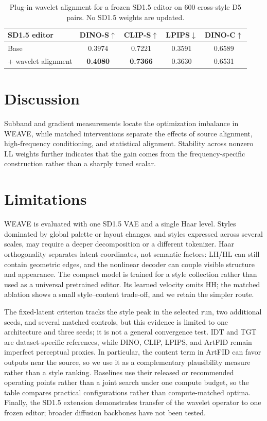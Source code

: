 \documentclass[letterpaper]{article}
\begin{document}
\begin{table}[t]
\centering
\footnotesize
\setlength{\tabcolsep}{4pt}
\begin{tabular}{@{}lcccc@{}}
\toprule
SD1.5 editor & DINO-S$\uparrow$ & CLIP-S$\uparrow$ & LPIPS$\downarrow$ & DINO-C$\uparrow$ \\
\midrule
Base & 0.3974 & 0.7221 & 0.3591 & 0.6589 \\
+ wavelet alignment & \textbf{0.4080} & \textbf{0.7366} & 0.3630 & 0.6531 \\
\bottomrule
\end{tabular}
\caption{Plug-in wavelet alignment for a frozen SD1.5 editor on 600 cross-style D5 pairs. No SD1.5 weights are updated.}
\label{tab:plugin}
\end{table}



\section{Discussion}
\label{sec:discussion}

Subband and gradient measurements locate the optimization imbalance in WEAVE, while matched
interventions separate the effects of source alignment, high-frequency conditioning, and
statistical alignment. Stability across nonzero LL weights further indicates that the gain
comes from the frequency-specific construction rather than a sharply tuned scalar.

\section{Limitations}

WEAVE is evaluated with one SD1.5 VAE and a single Haar level. Styles dominated by global
palette or layout changes, and styles expressed across several scales, may require a deeper
decomposition or a different tokenizer. Haar orthogonality separates latent coordinates,
not semantic factors: LH/HL can still contain geometric edges, and the nonlinear decoder can
couple visible structure and appearance. The compact model is trained for a style collection
rather than used as a universal pretrained editor. Its learned velocity omits HH; the matched
ablation shows a small style--content trade-off, and we retain the simpler route.

The fixed-latent criterion tracks the style peak in the selected run, two additional seeds,
and several matched controls, but this evidence is limited to one architecture and three
seeds; it is not a general convergence test.
IDT and TGT are dataset-specific references, while DINO, CLIP, LPIPS, and ArtFID remain
imperfect perceptual proxies. In particular, the content term in ArtFID can favor outputs
near the source, so we use it as a complementary plausibility measure rather than a style
ranking. Baselines use their released or recommended operating points rather than a joint
search under one compute budget, so the table compares practical configurations rather than
compute-matched optima. Finally, the SD1.5 extension demonstrates transfer of the wavelet
operator to one frozen editor; broader diffusion backbones have not been tested.
\end{document}

